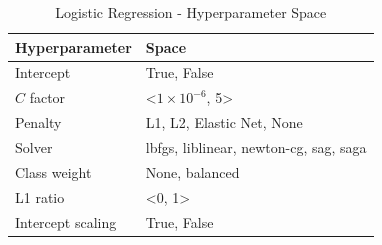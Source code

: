 \begin{table}[H]
\small
\setlength{\tabcolsep}{8pt}
\renewcommand{\arraystretch}{1.3}
\centering
    \caption[Logistic Regression - Hyperparameter Space]{Logistic Regression - Hyperparameter Space}\label{tab:lrspace}
    \begin{tabular}{ll}
\toprule
\textbf{Hyperparameter} & \textbf{Space}\\
\midrule
\hline
Intercept & True, False \\
$C$ factor & <$1\times10^{-6}$, 5>\\
Penalty & L1, L2, Elastic Net, None \\
Solver & lbfgs, liblinear, newton-cg, sag, saga \\
Class weight & None, balanced \\
L1 ratio & <0, 1> \\
Intercept scaling & True, False  \\
\hline
\bottomrule
\end{tabular}
\vspace{0.7em}

\vspace{-1em}
\end{table}



